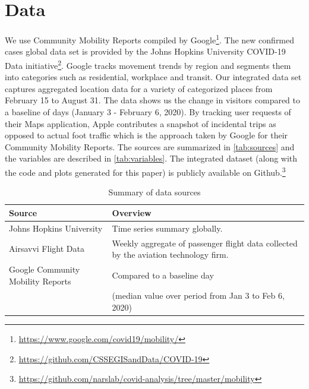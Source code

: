 \documentclass[titlepage,oneside,12pt]{article}
\newcommand{\trbcite}[1]{({\it \citenum{#1}})}
\newcommand{\?}{\stackrel{?}{=}}
\begin{document}



\section{Data}
We use Community Mobility Reports compiled by Google\footnote{\url{https://www.google.com/covid19/mobility/}}. %
The new confirmed cases global data set is provided by the Johns Hopkins University COVID-19 Data initiative\footnote{\url{https://github.com/CSSEGISandData/COVID-19}}.
Google tracks movement trends by region and segments them into categories such as residential, workplace and transit. Our integrated data set captures aggregated location data for a variety of categorized places from February 15 to August 31. The data shows us the change in visitors compared to a baseline of days (January 3 - February 6, 2020). By tracking user requests of their Maps application, Apple contributes a snapshot of incidental trips as opposed to actual foot traffic which is the approach taken by Google for their Community Mobility Reports. 
The sources are summarized in \autoref{tab:sources} and the variables are described in \autoref{tab:variables}.
The integrated dataset (along with the code and plots generated for this paper) is publicly available on Github.\footnote{\url{https://github.com/narslab/covid-analysis/tree/master/mobility}}


\begin{table}[h!]\small
  \centering
  \caption{Summary of data sources}
  \label{tab:sources}
\begin{tabular}{ll}\toprule
\bf Source                         & \bf Overview                                                                              \\\midrule
Johns Hopkins University          & Time series summary globally.                                                               \\
Airsavvi Flight Data                        & Weekly aggregate of passenger flight data collected by the aviation technology firm.                                          \\
  Google Community Mobility Reports & Compared to a baseline day \\
  & (median value over period from Jan 3 to Feb 6, 2020)\\\bottomrule
\end{tabular}
\end{table}
\end{document}
